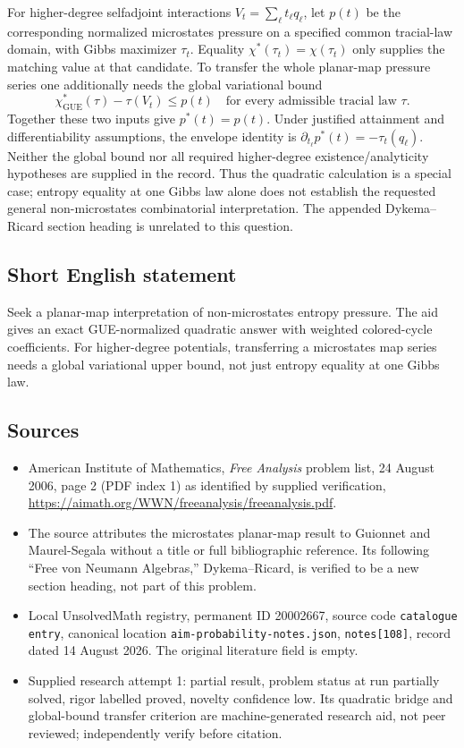 \documentclass[11pt]{article}
\begin{document}
For higher-degree selfadjoint interactions $V_t=\sum_\ell t_\ell q_\ell$, let $p(t)$ be the corresponding normalized microstates pressure on a specified common tracial-law domain, with Gibbs maximizer $\tau_t$. Equality $\chi^*(\tau_t)=\chi(\tau_t)$ only supplies the matching value at that candidate. To transfer the whole planar-map pressure series one additionally needs the global variational bound
\[
 \chi^*_{\mathrm{GUE}}(\tau)-\tau(V_t)\le p(t)
 \quad\text{for every admissible tracial law }\tau.
\]
Together these two inputs give $p^*(t)=p(t)$. Under justified attainment and differentiability assumptions, the envelope identity is $\partial_{t_\ell}p^*(t)=-\tau_t(q_\ell)$. Neither the global bound nor all required higher-degree existence/analyticity hypotheses are supplied in the record. Thus the quadratic calculation is a special case; entropy equality at one Gibbs law alone does not establish the requested general non-microstates combinatorial interpretation. The appended Dykema--Ricard section heading is unrelated to this question.
\subsection{Short English statement}
Seek a planar-map interpretation of non-microstates entropy pressure. The aid gives an exact GUE-normalized quadratic answer with weighted colored-cycle coefficients. For higher-degree potentials, transferring a microstates map series needs a global variational upper bound, not just entropy equality at one Gibbs law.
\subsection{Sources}
\begin{itemize}
\item American Institute of Mathematics, \emph{Free Analysis} problem list, 24 August 2006, page 2 (PDF index 1) as identified by supplied verification, \url{https://aimath.org/WWN/freeanalysis/freeanalysis.pdf}.
\item The source attributes the microstates planar-map result to Guionnet and Maurel-Segala without a title or full bibliographic reference. Its following ``Free von Neumann Algebras,'' Dykema--Ricard, is verified to be a new section heading, not part of this problem.
\item Local UnsolvedMath registry, permanent ID 20002667, source code \texttt{catalogue entry}, canonical location \texttt{aim-probability-notes.json}, \texttt{notes[108]}, record dated 14 August 2026. The original literature field is empty.
\item Supplied research attempt 1: partial result, problem status at run partially solved, rigor labelled proved, novelty confidence low. Its quadratic bridge and global-bound transfer criterion are machine-generated research aid, not peer reviewed; independently verify before citation.
\end{itemize}
\end{document}
